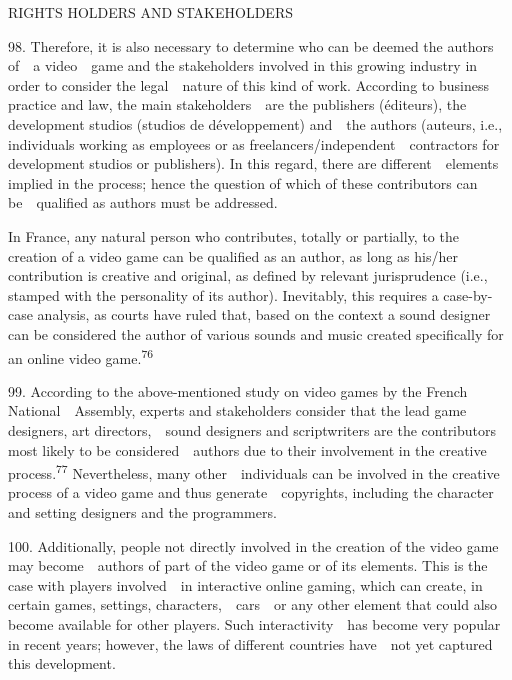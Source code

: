 \documentclass[
]{article}
\begin{document}
{RIGHTS HOLDERS AND STAKEHOLDERS}

{98. }{Therefore, it is also necessary to determine who can be deemed
the }{authors }{of~~a video~~game and the stakeholders involved in this
growing industry in order to consider the legal~~nature of this kind of
work. According to business practice and law, the main stakeholders~~are
the publishers (}{éditeurs}{), the development studios (}{studios de
développement}{) and~~the authors (}{auteurs}{, i.e., individuals
working as employees or as freelancers/independent~~contractors for
development studios or publishers). In this regard, there are
different~~elements implied in the process; hence the question of which
of these contributors can be~~qualified as authors must be addressed.}

{In France, any natural person who contributes, totally or partially, to
the creation of a video game can be qualified as an author, as long as
his/her contribution is creative and original, as defined by relevant
jurisprudence (i.e., stamped with the personality of its author).
Inevitably, this requires a case-by-case analysis, as courts have ruled
that, based on the context a sound designer can be considered the author
of various sounds and music created specifically for an online video
game.}\textsuperscript{{76}}

{99. }{According to the above-mentioned study on video games by the
French National~~Assembly, experts and stakeholders consider that the
lead game designers, art directors,~~sound designers and scriptwriters
are the contributors most likely to be considered~~authors due to their
involvement in the creative process.}\textsuperscript{{77
}}{Nevertheless, many other~~individuals can be involved in the creative
process of a video game and thus generate~~copyrights, including the
character and setting designers and the programmers.}

{100. }{Additionally, people not directly involved in the creation of
the video game may become~~authors of part of the video game or of its
elements. This is the case with players involved~~in interactive online
gaming, which can create, in certain games, settings,
characters,~~cars~~or any other element that could also become available
for other players. Such interactivity~~has become very popular in recent
years; however, the laws of different countries have~~not yet captured
this development.}
\end{document}
